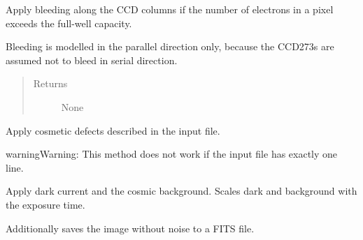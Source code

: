 \documentclass[a4paper,12pt,english]{sphinxmanual}
\begin{document}
\begin{fulllineitems}
\begin{fulllineitems}
\end{fulllineitems}


\begin{fulllineitems}
\label{simulator:simulator.simulator.VISsimulator.applyBleeding}
Apply bleeding along the CCD columns if the number of electrons in a pixel exceeds the full-well capacity.

Bleeding is modelled in the parallel direction only, because the CCD273s are assumed not to bleed in
serial direction.
\begin{quote}\begin{description}
\item[{Returns}] \leavevmode
None

\end{description}\end{quote}

\end{fulllineitems}


\begin{fulllineitems}
\label{simulator:simulator.simulator.VISsimulator.applyCosmetics}
Apply cosmetic defects described in the input file.

\begin{notice}{warning}{Warning:}
This method does not work if the input file has exactly one line.
\end{notice}

\end{fulllineitems}


\begin{fulllineitems}
\label{simulator:simulator.simulator.VISsimulator.applyDarkCurrentAndCosmicBackground}
Apply dark current and the cosmic background.
Scales dark and background with the exposure time.

Additionally saves the image without noise to a FITS file.

\end{fulllineitems}



\end{fulllineitems}
\end{document}
